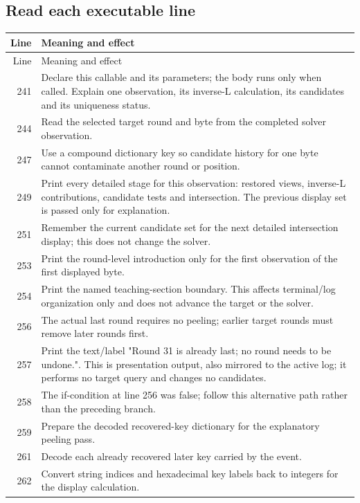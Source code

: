 \subsection*{Read each executable line}
\begingroup\small\begin{longtable}{r >{\raggedright\arraybackslash}p{138mm}}\toprule Line&Meaning and effect\\\midrule\endfirsthead\toprule Line&Meaning and effect\\\midrule\endhead
241&Declare this callable and its parameters; the body runs only when called. Explain one observation, its inverse-L calculation, its candidates and its uniqueness status.\\
244&Read the selected target round and byte from the completed solver observation.\\
247&Use a compound dictionary key so candidate history for one byte cannot contaminate another round or position.\\
249&Print every detailed stage for this observation: restored views, inverse-L contributions, candidate tests and intersection. The previous display set is passed only for explanation.\\
251&Remember the current candidate set for the next detailed intersection display; this does not change the solver.\\
253&Print the round-level introduction only for the first observation of the first displayed byte.\\
254&Print the named teaching-section boundary. This affects terminal/log organization only and does not advance the target or the solver.\\
256&The actual last round requires no peeling; earlier target rounds must remove later rounds first.\\
257&Print the text/label "Round 31 is already last; no round needs to be undone.". This is presentation output, also mirrored to the active log; it performs no target query and changes no candidates.\\
258&The if-condition at line 256 was false; follow this alternative path rather than the preceding branch.\\
259&Prepare the decoded recovered-key dictionary for the explanatory peeling pass.\\
261&Decode each already recovered later key carried by the event.\\
262&Convert string indices and hexadecimal key labels back to integers for the display calculation.\\

\end{longtable}
